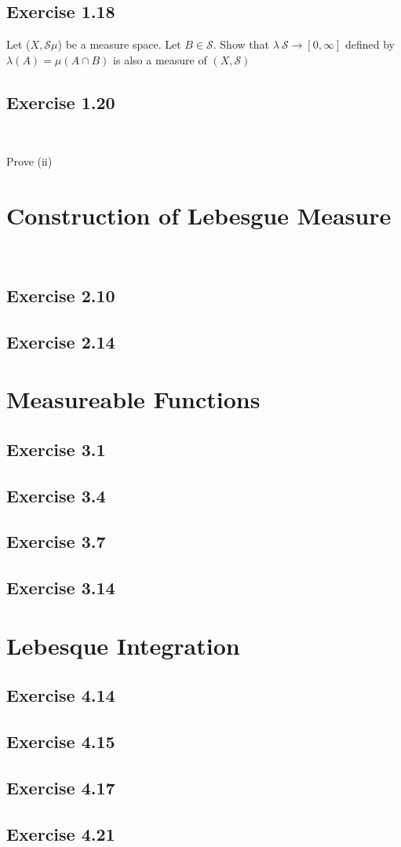 \documentclass{article}
\theoremstyle{definition}
\begin{document}
\subsection{Exercise 1.18}

Let ($X, \mathcal{S} \mu$) be a measure space. Let $B \in \mathcal{S}$. Show that $ \lambda \: \mathcal{S} \rightarrow [0, \infty]$ defined by $\lambda(A) = \mu(A \cap B)$ is also a measure of $(X, \mathcal{S})$

\subsection{Exercise 1.20}

\

Prove (ii)

\section{Construction of Lebesgue Measure}

\


\subsection{Exercise 2.10}

\subsection{Exercise 2.14}

\section{Measureable Functions}

\subsection{Exercise 3.1}
\subsection{Exercise 3.4}
\subsection{Exercise 3.7}
\subsection{Exercise 3.14}

\section{Lebesque Integration}
\subsection{Exercise 4.14}

\subsection{Exercise 4.15}

\subsection{Exercise 4.17}

\subsection{Exercise 4.21}
\end{document}
